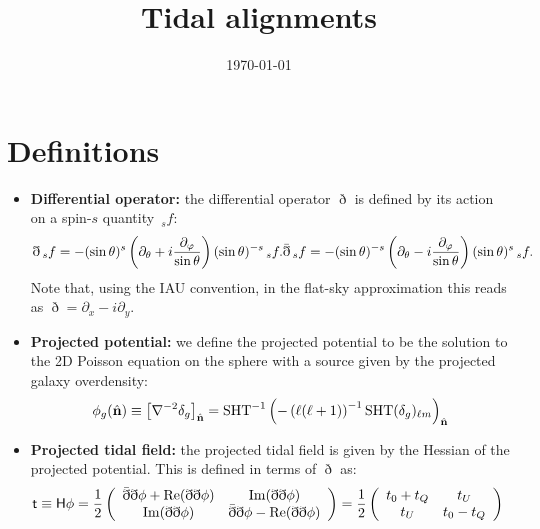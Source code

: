 \documentclass{article}
\title{Tidal alignments}
\date{\today}
\newcommand{\nv}{\hat{\bf n}}
\begin{document}
\maketitle

\section{Definitions}
  \begin{itemize}
    \item {\bf Differential operator:} the differential operator $\eth$ is defined by its action on a spin-$s$ quantity $\,_sf$:
    \begin{equation}
      \eth\,_sf=-(\sin\theta)^s\left(\partial_\theta+i\frac{\partial_\varphi}{\sin\theta}\right)(\sin\theta)^{-s}\,_sf.\\
      \bar{\eth}\,_sf=-(\sin\theta)^{-s}\left(\partial_\theta-i\frac{\partial_\varphi}{\sin\theta}\right)(\sin\theta)^s\,_sf.\\
    \end{equation}
    Note that, using the IAU convention, in the flat-sky approximation this reads as $\eth=\partial_x - i\partial_y$.
    \item {\bf Projected potential:} we define the projected potential to be the solution to the 2D Poisson equation on the sphere with a source given by the projected galaxy overdensity:
    \begin{equation}
      \phi_g(\nv)\equiv\left[\nabla^{-2}\delta_g\right]_{\nv}={\rm SHT}^{-1}\left(-\left(\ell(\ell+1)\right)^{-1}{\rm SHT}(\delta_g)_{\ell m}\right)_{\nv}
    \end{equation}
    \item {\bf Projected tidal field:} the projected tidal field is given by the Hessian of the projected potential. This is defined in terms of $\eth$ as:
    \begin{align}
      {\sf t}\equiv{\sf H}\phi
      &=\frac{1}{2}\left(
      \begin{array}{cc}
        \bar{\eth}\eth\phi+{\rm Re}(\eth\eth\phi) & {\rm Im}(\eth\eth\phi) \\
        {\rm Im}(\eth\eth\phi) & \bar{\eth}\eth\phi-{\rm Re}(\eth\eth\phi)
      \end{array}\right)
      =\frac{1}{2}\left(
      \begin{array}{cc}
        t_0+t_Q & t_U\\
        t_U & t_0-t_Q
      \end{array}
      \right)
    \end{align}

\end{itemize}
\end{document}
